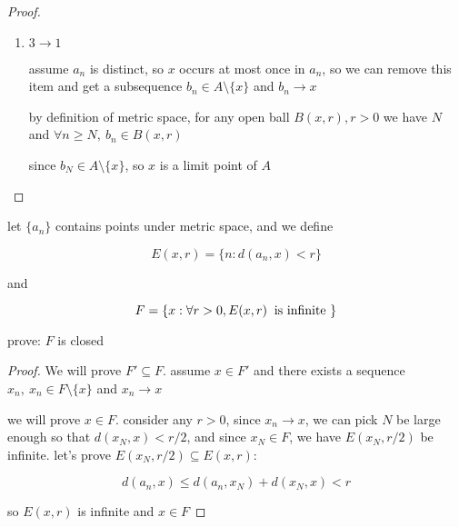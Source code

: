 \begin{proof}
\begin{enumerate}
        \item $3 \to 1$

        assume $a_n$ is distinct, so $x$ occurs at most once in $a_n$, so we can remove this item and get a subsequence $b_n \in A \setminus \{ x \}$
        and $b_n \to x$

        by definition of metric space, for any open ball $B(x, r), r > 0$ we have $N$ and $\forall n \ge N,\: b_n \in B(x,r)$

        since $b_N \in A \setminus \{ x \}$, so $x$ is a limit point of $A$
    \end{enumerate}
\end{proof}


\begin{exercise}
    let $\{ a_n \} $ contains points under metric space, and we define

    \[
        E(x, r) = \{ n : d(a_n, x) < r \}
    \]

    and

    \[
        F = \{ x: \forall r > 0, E(x,r) \text{\: is infinite }\}
    \]

    prove: $F$ is closed

\end{exercise}

\begin{proof}
    We will prove $F' \subseteq F$. assume $x \in F'$ and there exists a sequence $x_n,\: x_n \in F \setminus \{x\}$ and $x_n \to x$

    we will prove $x \in F$. consider any $r > 0$, since $x_n \to x$, we can pick $N$ be large enough so that
    $d(x_N, x) < r/2$, and since $x_N \in F$, we have $E(x_N, r/2)$ be infinite. let's prove $E(x_N, r/2) \subseteq E(x,r)$:

    \[
        d(a_n, x) \le d(a_n, x_N) + d(x_N, x) < r
    \]

    so $E(x,r)$ is infinite and $x \in F$
\end{proof}